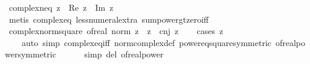 \begin{isabellebody}
\endisatagproof
{\isafoldproof}%
%
\isadelimproof
\isanewline
%
\endisadelimproof
\isanewline
{}\isamarkupfalse%
\ complex{\isacharunderscore}{\kern0pt}neq{\isacharunderscore}{\kern0pt}{}{\isacharcolon}{\kern0pt}\ {\isachardoublequoteopen}z{\isasymnoteq}{}\ {\isasymlongleftrightarrow}\ {\isacharparenleft}{\kern0pt}Re\ z{\isacharparenright}{\kern0pt}\ {\isacharplus}{\kern0pt}\ {\isacharparenleft}{\kern0pt}Im\ z{\isacharparenright}{\kern0pt}\ {\isachargreater}{\kern0pt}\ {}{\isachardoublequoteclose}\isanewline
%
\isadelimproof
\ \ %
\endisadelimproof
%
\isatagproof
{}\isamarkupfalse%
\ {\isacharparenleft}{\kern0pt}metis\ complex{\isacharunderscore}{\kern0pt}eq{\isacharunderscore}{\kern0pt}{}\ less{\isacharunderscore}{\kern0pt}numeral{\isacharunderscore}{\kern0pt}extra{\isacharparenleft}{\kern0pt}{}{\isacharparenright}{\kern0pt}\ sum{\isacharunderscore}{\kern0pt}power{}{\isacharunderscore}{\kern0pt}gt{\isacharunderscore}{\kern0pt}zero{\isacharunderscore}{\kern0pt}iff{\isacharparenright}{\kern0pt}%
\endisatagproof
{\isafoldproof}%
%
\isadelimproof
\isanewline
%
\endisadelimproof
\isanewline
{}\isamarkupfalse%
\ complex{\isacharunderscore}{\kern0pt}norm{\isacharunderscore}{\kern0pt}square{\isacharcolon}{\kern0pt}\ {\isachardoublequoteopen}of{\isacharunderscore}{\kern0pt}real\ {\isacharparenleft}{\kern0pt}{\isacharparenleft}{\kern0pt}norm\ z{\isacharparenright}{\kern0pt}\ {\isacharequal}{\kern0pt}\ z\ {\isacharasterisk}{\kern0pt}\ cnj\ z{\isachardoublequoteclose}\isanewline
%
\isadelimproof
\ \ %
\endisadelimproof
%
\isatagproof
{}\isamarkupfalse%
\ {\isacharparenleft}{\kern0pt}cases\ z{\isacharparenright}{\kern0pt}\isanewline
\ \ \ \ {\isacharparenleft}{\kern0pt}auto\ simp{\isacharcolon}{\kern0pt}\ complex{\isacharunderscore}{\kern0pt}eq{\isacharunderscore}{\kern0pt}iff\ norm{\isacharunderscore}{\kern0pt}complex{\isacharunderscore}{\kern0pt}def\ power{}{\isacharunderscore}{\kern0pt}eq{\isacharunderscore}{\kern0pt}square{\isacharbrackleft}{\kern0pt}symmetric{\isacharbrackright}{\kern0pt}\ of{\isacharunderscore}{\kern0pt}real{\isacharunderscore}{\kern0pt}power{\isacharbrackleft}{\kern0pt}symmetric{\isacharbrackright}{\kern0pt}\isanewline
\ \ \ \ \ \ simp\ del{\isacharcolon}{\kern0pt}\ of{\isacharunderscore}{\kern0pt}real{\isacharunderscore}{\kern0pt}power{\isacharparenright}{\kern0pt}%
\endisatagproof
{\isafoldproof}%

\end{isabellebody}
